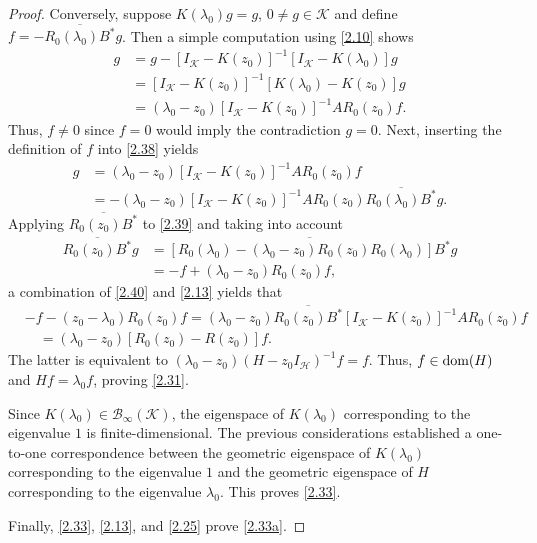 \documentclass[reqno,10pt, centertags]{amsart}
\newcounter{count}
\newcommand{\cB}{{\mathcal B}}
\newcommand{\cH}{{\mathcal H}}
\newcommand{\cK}{{\mathcal K}}
\newcommand{\no}{\nonumber}
\newcommand{\lb}{\label}
\newcommand{\ol}{\overline}
\newcommand{\dom}{\text{\rm{dom}}}
\numberwithin{equation}{section}
\theoremstyle{definition}
\begin{document}
\begin{proof}
Conversely, suppose $K(\lambda_0)g=g$, $0\neq g\in\cK$ and define
$f=-\ol{R_0(\lambda_0)B^*}g$. Then a simple computation using
\eqref{2.10} shows
\begin{align}
g&=g-[I_{\cK}-K(z_0)]^{-1}[I_{\cK}-K(\lambda_0)]g \no \\
&=[I_{\cK}-K(z_0)]^{-1}[K(\lambda_0)-K(z_0)]g \no \\
&=(\lambda_0-z_0)[I_{\cK}-K(z_0)]^{-1}AR_0(z_0)f. \lb{2.38}
\end{align}
Thus, $f\neq0$ since $f=0$ would imply the contradiction $g=0$. Next,
inserting the definition of $f$ into \eqref{2.38} yields
\begin{align}
g&=(\lambda_0-z_0)[I_{\cK}-K(z_0)]^{-1}AR_0(z_0)f \no \\
&=-(\lambda_0-z_0)[I_{\cK}-K(z_0)]^{-1}AR_0(z_0)
\ol{R_0(\lambda_0)B^*}g. \lb{2.39}
\end{align}
Applying $\ol{R_0(z_0)B^*}$ to \eqref{2.39} and taking into account
\begin{align}
\ol{R_0(z_0)B^*}g&=\ol{[R_0(\lambda_0)
-(\lambda_0-z_0)R_0(z_0)R_0(\lambda_0)]B^*}g \no \\
&=-f+(\lambda_0-z_0)R_0(z_0)f,  \lb{2.40}
\end{align}
a combination of \eqref{2.40} and \eqref{2.13} yields that
\begin{align}
& -f-(z_0-\lambda_0)R_0(z_0)f=(\lambda_0-z_0)\ol{R_0(z_0)B^*}
[I_{\cK}-K(z_0)]^{-1}AR_0(z_0)f \no \\
& \quad = (\lambda_0-z_0)[R_0(z_0)-R(z_0)]f.   \lb{2.41}
\end{align}
The latter is equivalent to $(\lambda_0-z_0)(H-z_0I_{\cH})^{-1}f=f$.
Thus, $f\in\dom(H)$ and $Hf=\lambda_0f$, proving \eqref{2.31}.

Since $K(\lambda_0)\in\cB_\infty(\cK)$, the eigenspace of
$K(\lambda_0)$ corresponding to the eigenvalue $1$ is
finite-dimensional. The previous considerations established a
one-to-one correspondence between the geometric eigenspace of
$K(\lambda_0)$ corresponding to the eigenvalue $1$ and the geometric
eigenspace of $H$ corresponding to the eigenvalue $\lambda_0$. This
proves \eqref{2.33}.

Finally, \eqref{2.33}, \eqref{2.13}, and \eqref{2.25} prove
\eqref{2.33a}.
\end{proof}
\end{document}

